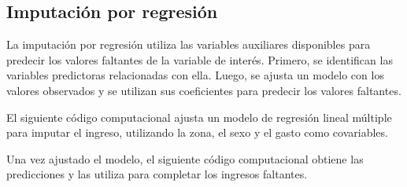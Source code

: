 \documentclass[
  spanish,
  11pt,
  letterpaper,
  oneside,
  open=any]{scrbook}
\newenvironment{Shaded}{\begin{snugshade}}{\end{snugshade}}
\newcommand{\AttributeTok}[1]{\textcolor[rgb]{0.40,0.45,0.13}{#1}}
\newcommand{\FunctionTok}[1]{\textcolor[rgb]{0.28,0.35,0.67}{#1}}
\newcommand{\NormalTok}[1]{\textcolor[rgb]{0.00,0.23,0.31}{#1}}
\newcommand{\OtherTok}[1]{\textcolor[rgb]{0.00,0.23,0.31}{#1}}
\newcommand{\SpecialCharTok}[1]{\textcolor[rgb]{0.37,0.37,0.37}{#1}}
\begin{document}
\subsection{Imputación por
regresión}\label{imputaciuxf3n-por-regresiuxf3n}

La imputación por regresión utiliza las variables auxiliares disponibles
para predecir los valores faltantes de la variable de interés. Primero,
se identifican las variables predictoras relacionadas con ella. Luego,
se ajusta un modelo con los valores observados y se utilizan sus
coeficientes para predecir los valores faltantes.

El siguiente código computacional ajusta un modelo de regresión lineal
múltiple para imputar el ingreso, utilizando la zona, el sexo y el gasto
como covariables.

\begin{Shaded}
\end{Shaded}

Una vez ajustado el modelo, el siguiente código computacional obtiene
las predicciones y las utiliza para completar los ingresos faltantes.

\begin{Shaded}
\end{Shaded}
\end{document}
